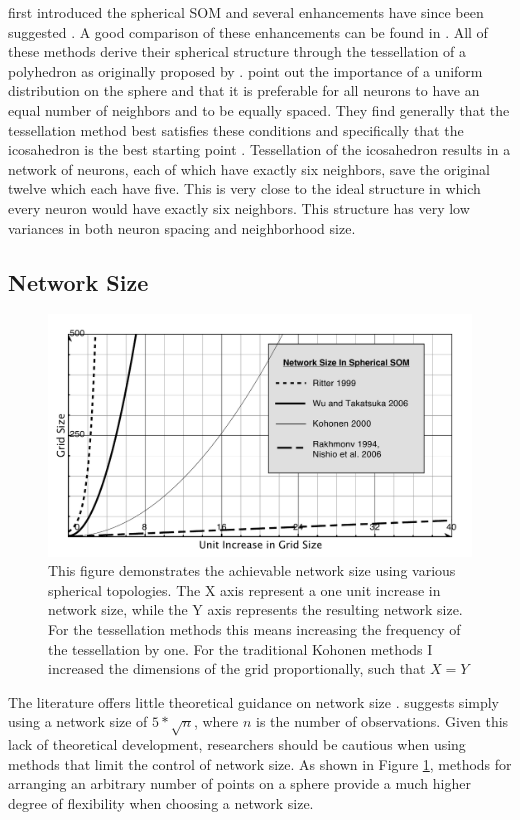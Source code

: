 \documentclass[10pt,titlepage]{article}
\begin{document}
\cite{ritter99} first introduced the spherical SOM and several enhancements have
since been suggested \citep{boudjemai2003,sangole03,Nishio:2006fk,wu2006}.  A
good comparison of these enhancements can be found in \cite{wu2006}.  All of
these methods derive their spherical structure through the tessellation of a
polyhedron as originally proposed by \cite{ritter99}.  \cite{wu2006} point
out the importance of a uniform distribution on the sphere and that it is
preferable for all neurons to have an equal number of neighbors and to be
equally spaced.  They find generally that the tessellation method best satisfies
these conditions and specifically that the icosahedron is the best starting
point \citep{wu2005}. Tessellation of the icosahedron results in a network of
neurons, each of which have exactly six neighbors, save the original twelve
which each have five.  This is very close to the ideal structure in which every
neuron would have exactly six neighbors.  This structure has very low variances
in both neuron spacing and neighborhood size.


\subsection{Network Size}
\begin{figure}
\centering
\includegraphics[width=\linewidth]{networkSize.pdf}
\caption{This figure demonstrates the achievable network size using various
spherical topologies.  The X axis represent a one unit increase in network size,
while the Y axis represents the resulting network size.
For the tessellation methods this means increasing the frequency of the tessellation
by one.  For the traditional Kohonen methods I increased the dimensions of the
grid proportionally, such that $X=Y$}
\label{fig:nSize}
\end{figure}
The literature offers little theoretical guidance on network size
\citep{cho1996}.  \cite{toolbox} suggests simply using a network size of
\(5*\sqrt {n}\), where \(n\) is the number of observations. Given this lack of
theoretical development, researchers should be cautious when using methods that
limit the control of network size.  As shown in Figure \ref{fig:nSize},
methods for arranging an arbitrary number of points on a sphere provide a much
higher degree of flexibility when choosing a network size.
\end{document}

